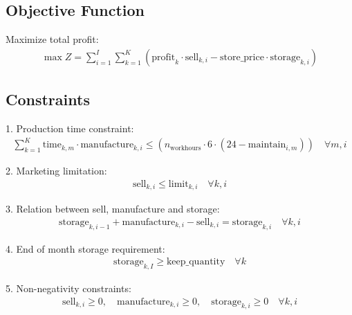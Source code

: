 \documentclass{article}
\begin{document}
\subsection*{Objective Function}
Maximize total profit:
\begin{align}
\max Z = \sum_{i=1}^{I}\sum_{k=1}^{K} \left( \text{profit}_{k} \cdot \text{sell}_{k, i} - \text{store\_price} \cdot \text{storage}_{k, i} \right)
\end{align}

\subsection*{Constraints}
1. Production time constraint:
\begin{align}
\sum_{k=1}^{K} \text{time}_{k, m} \cdot \text{manufacture}_{k, i} \leq (n_{\text{workhours}} \cdot 6 \cdot (24 - \text{maintain}_{i, m})) \quad \forall m, i
\end{align}

2. Marketing limitation:
\begin{align}
\text{sell}_{k, i} \leq \text{limit}_{k, i} \quad \forall k, i
\end{align}

3. Relation between sell, manufacture and storage:
\begin{align}
\text{storage}_{k, i-1} + \text{manufacture}_{k, i} - \text{sell}_{k, i} = \text{storage}_{k, i} \quad \forall k, i
\end{align}

4. End of month storage requirement:
\begin{align}
\text{storage}_{k, I} \geq \text{keep\_quantity} \quad \forall k
\end{align}

5. Non-negativity constraints:
\begin{align}
\text{sell}_{k, i} \geq 0, \quad \text{manufacture}_{k, i} \geq 0, \quad \text{storage}_{k, i} \geq 0 \quad \forall k, i
\end{align}
\end{document}
